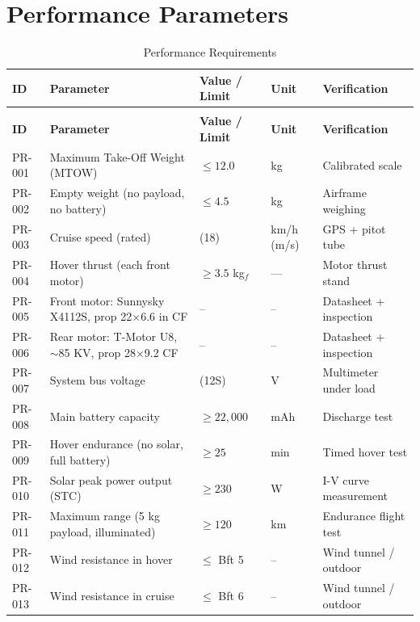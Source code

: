 \section{Performance Parameters}

\begin{longtable}{>{\raggedright\arraybackslash}p{1.4cm}
                  >{\raggedright\arraybackslash}p{6.0cm}
                  >{\centering\arraybackslash}p{3.0cm}
                  >{\centering\arraybackslash}p{1.4cm}
                  >{\raggedright\arraybackslash}p{2.4cm}}
\caption{Performance Requirements} \label{tab:PR} \\
\toprule
\textbf{ID} & \textbf{Parameter} & \textbf{Value / Limit} & \textbf{Unit} & \textbf{Verification} \\
\midrule
\endfirsthead
\multicolumn{5}{c}{\tablename\ \thetable{} (continued)} \\
\toprule
\textbf{ID} & \textbf{Parameter} & \textbf{Value / Limit} & \textbf{Unit} & \textbf{Verification} \\
\midrule
\endhead
\bottomrule
\endfoot
PR-001 & Maximum Take-Off Weight (MTOW)                              & $\leq 12.0$          & kg     & Calibrated scale \\
PR-002 & Empty weight (no payload, no battery)                       & $\leq 4.5$           & kg     & Airframe weighing \\
PR-003 & Cruise speed (rated)                                        & 65 (18)              & km/h (m/s) & GPS + pitot tube \\
PR-004 & Hover thrust (each front motor)                             & $\geq 3.5$ kg$_f$    & ---    & Motor thrust stand \\
PR-005 & Front motor: Sunnysky X4112S, prop 22$\times$6.6 in CF      & --                   & --     & Datasheet + inspection \\
PR-006 & Rear motor: T-Motor U8, $\sim$85 KV, prop 28$\times$9.2 CF  & --                   & --     & Datasheet + inspection \\
PR-007 & System bus voltage                                          & 44.4 (12S)           & V      & Multimeter under load \\
PR-008 & Main battery capacity                                       & $\geq 22{,}000$      & mAh    & Discharge test \\
PR-009 & Hover endurance (no solar, full battery)                    & $\geq 25$            & min    & Timed hover test \\
PR-010 & Solar peak power output (STC)                               & $\geq 230$           & W      & I-V curve measurement \\
PR-011 & Maximum range (5 kg payload, illuminated)                   & $\geq 120$           & km     & Endurance flight test \\
PR-012 & Wind resistance in hover                                    & $\leq$ Bft 5         & --     & Wind tunnel / outdoor \\
PR-013 & Wind resistance in cruise                                   & $\leq$ Bft 6         & --     & Wind tunnel / outdoor \\
\end{longtable}

